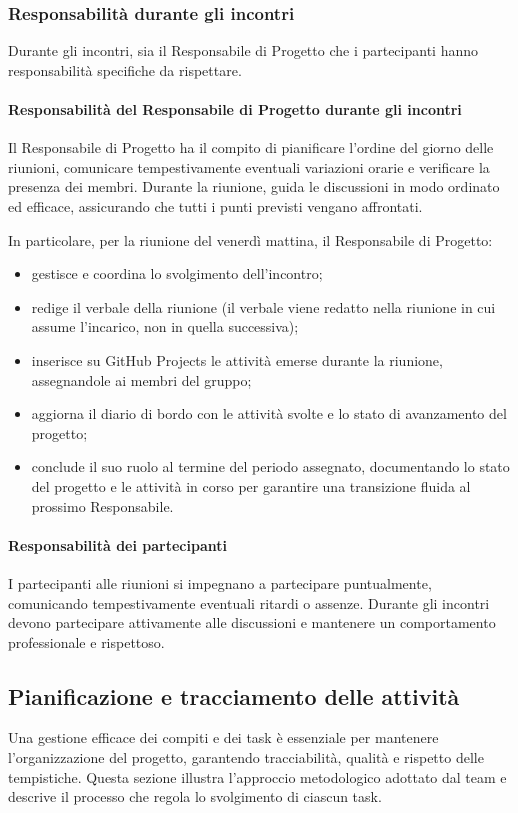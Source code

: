 \documentclass[a4paper, 11pt, oneside]{scrartcl} %
\begin{document}
\subsubsection{Responsabilità durante gli incontri}
Durante gli incontri, sia il Responsabile di Progetto che i partecipanti hanno responsabilità specifiche da rispettare.

\paragraph{Responsabilità del Responsabile di Progetto durante gli incontri}
Il Responsabile di Progetto ha il compito di pianificare l'ordine del giorno delle riunioni, comunicare tempestivamente eventuali variazioni orarie e verificare la presenza dei membri.
Durante la riunione, guida le discussioni in modo ordinato ed efficace, assicurando che tutti i punti previsti vengano affrontati.

In particolare, per la riunione del venerdì mattina, il Responsabile di Progetto:
\begin{itemize}
    \item gestisce e coordina lo svolgimento dell'incontro;
    \item redige il verbale della riunione (il verbale viene redatto nella riunione in cui assume l'incarico, non in quella successiva);
    \item inserisce su GitHub Projects le attività emerse durante la riunione, assegnandole ai membri del gruppo;
    \item aggiorna il diario di bordo con le attività svolte e lo stato di avanzamento del progetto;
    \item conclude il suo ruolo al termine del periodo assegnato, documentando lo stato del progetto e le attività in corso per garantire una transizione fluida al prossimo Responsabile.
\end{itemize}

\paragraph{Responsabilità dei partecipanti}
I partecipanti alle riunioni si impegnano a partecipare puntualmente, comunicando tempestivamente eventuali ritardi o assenze.
Durante gli incontri devono partecipare attivamente alle discussioni e mantenere un comportamento professionale e rispettoso.

\subsection{Pianificazione e tracciamento delle attività}
Una gestione efficace dei compiti e dei task è essenziale per mantenere l'organizzazione del progetto, garantendo tracciabilità, qualità e rispetto delle tempistiche.
Questa sezione illustra l'approccio metodologico adottato dal team e descrive il processo che regola lo svolgimento di ciascun task.
\end{document}
